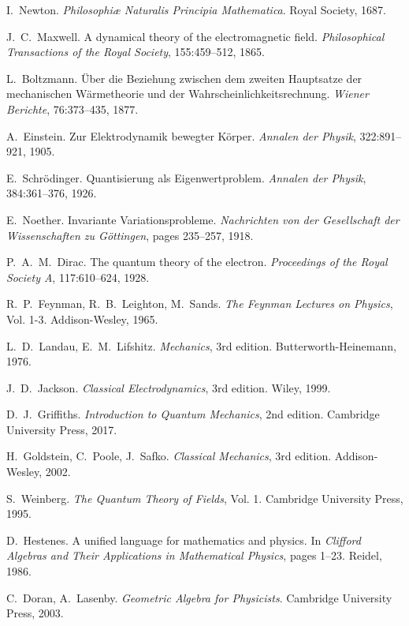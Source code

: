 \documentclass[12pt,a4paper]{article}
\theoremstyle{definition}
\theoremstyle{remark}
\begin{document}
\begin{thebibliography}{99}

I.~Newton.
\newblock \emph{Philosophiæ Naturalis Principia Mathematica}.
\newblock Royal Society, 1687.

J.~C.~Maxwell.
\newblock A dynamical theory of the electromagnetic field.
\newblock \emph{Philosophical Transactions of the Royal Society}, 155:459--512, 1865.

L.~Boltzmann.
\newblock Über die Beziehung zwischen dem zweiten Hauptsatze der mechanischen Wärmetheorie und der Wahrscheinlichkeitsrechnung.
\newblock \emph{Wiener Berichte}, 76:373--435, 1877.

A.~Einstein.
\newblock Zur Elektrodynamik bewegter Körper.
\newblock \emph{Annalen der Physik}, 322:891--921, 1905.

E.~Schrödinger.
\newblock Quantisierung als Eigenwertproblem.
\newblock \emph{Annalen der Physik}, 384:361--376, 1926.

E.~Noether.
\newblock Invariante Variationsprobleme.
\newblock \emph{Nachrichten von der Gesellschaft der Wissenschaften zu Göttingen}, pages 235--257, 1918.

P.~A.~M.~Dirac.
\newblock The quantum theory of the electron.
\newblock \emph{Proceedings of the Royal Society A}, 117:610--624, 1928.

R.~P.~Feynman, R.~B.~Leighton, M.~Sands.
\newblock \emph{The Feynman Lectures on Physics}, Vol. 1-3.
\newblock Addison-Wesley, 1965.

L.~D.~Landau, E.~M.~Lifshitz.
\newblock \emph{Mechanics}, 3rd edition.
\newblock Butterworth-Heinemann, 1976.

J.~D.~Jackson.
\newblock \emph{Classical Electrodynamics}, 3rd edition.
\newblock Wiley, 1999.

D.~J.~Griffiths.
\newblock \emph{Introduction to Quantum Mechanics}, 2nd edition.
\newblock Cambridge University Press, 2017.

H.~Goldstein, C.~Poole, J.~Safko.
\newblock \emph{Classical Mechanics}, 3rd edition.
\newblock Addison-Wesley, 2002.

S.~Weinberg.
\newblock \emph{The Quantum Theory of Fields}, Vol. 1.
\newblock Cambridge University Press, 1995.

D.~Hestenes.
\newblock A unified language for mathematics and physics.
\newblock In \emph{Clifford Algebras and Their Applications in Mathematical Physics}, pages 1--23. Reidel, 1986.

C.~Doran, A.~Lasenby.
\newblock \emph{Geometric Algebra for Physicists}.
\newblock Cambridge University Press, 2003.

\end{thebibliography}
\end{document}

